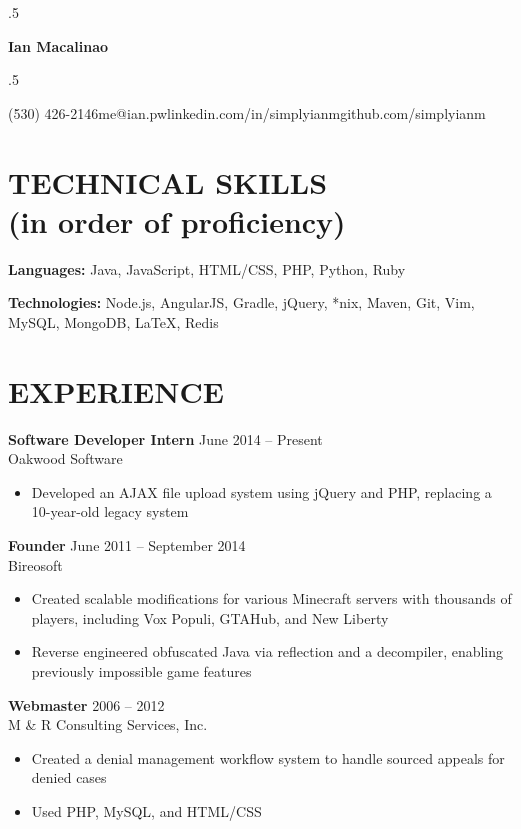 \documentclass[margin, 10pt]{res} %
\makeatletter
\def\ULurl@#1{\hyper@linkurl{\ULurl@@{#1}}{#1}}
\DeclareRobustCommand*\ULurl{\hyper@normalise\ULurl@}
\newcommand*{\its}{\hspace{0.8cm}}
\makeatother
\begin{document}
\moveleft.5\hoffset\centerline{\Huge\bf Ian Macalinao}
\bigskip
\moveleft.5\hoffset\centerline{(530) 426-2146\its{}me@ian.pw\its{}\ULurl{http://ian.pw}\its{}linkedin.com/in/simplyianm\its{}github.com/simplyianm}

\begin{resume}

  \section{TECHNICAL SKILLS \\ \textnormal{(in order of proficiency)}} 

  {\bf Languages:} Java, JavaScript, HTML/CSS, PHP, Python, Ruby

  {\bf Technologies:} Node.js, AngularJS, Gradle, jQuery, *nix, Maven, Git, Vim, MySQL, MongoDB, \LaTeX, Redis

  \section{EXPERIENCE}

  {\bf Software Developer Intern} \hfill June 2014 -- Present \\
  Oakwood Software

  \begin{itemize} \itemsep -2pt
    \item Developed an AJAX file upload system using jQuery and PHP, replacing a 10-year-old legacy system
  \end{itemize}

  {\bf Founder} \hfill June 2011 -- September 2014 \\
  Bireosoft

  \begin{itemize} \itemsep -2pt
    \item Created scalable modifications for various Minecraft servers with thousands of players, including Vox Populi, GTAHub, and New Liberty
    \item Reverse engineered obfuscated Java via reflection and a decompiler, enabling previously impossible game features
  \end{itemize}

  {\bf Webmaster} \hfill 2006 -- 2012 \\
  M \& R Consulting Services, Inc.
  \begin{itemize} \itemsep -2pt
    \item Created a denial management workflow system to handle sourced appeals for denied cases
    \item Used PHP, MySQL, and HTML/CSS
  \end{itemize} 


\end{resume}
\end{document}
